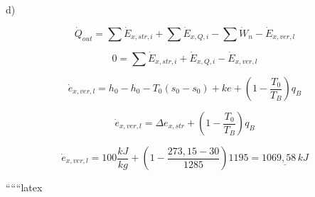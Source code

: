 d)

\begin{equation*}
\dot{Q}_{out} = \sum \dot{E}_{x,str,i} + \sum \dot{E}_{x,Q,i} - \sum \dot{W}_n - \dot{E}_{x,ver,l}
\end{equation*}

\begin{equation*}
0 = \sum \dot{E}_{x,str,i} + \dot{E}_{x,Q,i} - \dot{E}_{x,ver,l}
\end{equation*}

\begin{equation*}
\dot{e}_{x,ver,l} = h_0 - h_0 - T_0(s_0 - s_0) + ke + \left(1 - \frac{T_0}{T_B}\right)q_B
\end{equation*}

\begin{equation*}
\dot{e}_{x,ver,l} = \Delta e_{x,str} + \left(1 - \frac{T_0}{T_B}\right)q_B
\end{equation*}

\begin{equation*}
\dot{e}_{x,ver,l} = 100 \frac{kJ}{kg} + \left(1 - \frac{273,15 - 30}{1285}\right)1195 = \underline{1069,58 \, kJ}
\end{equation*}

``````latex
